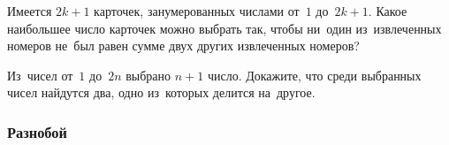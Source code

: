 \begin{problems}

\item
Имеется $2 k + 1$ карточек, занумерованных числами от~$1$ до~$2 k + 1$.
Какое наибольшее число карточек можно выбрать так, чтобы ни~один из~извлеченных
номеров не~был равен сумме двух других извлеченных номеров?

\item
Из~чисел от~$1$ до~$2 n$ выбрано $n + 1$ число.
Докажите, что среди выбранных чисел найдутся два, одно из~которых делится
на~другое.

\end{problems}

\subsubsection*{Разнобой}

